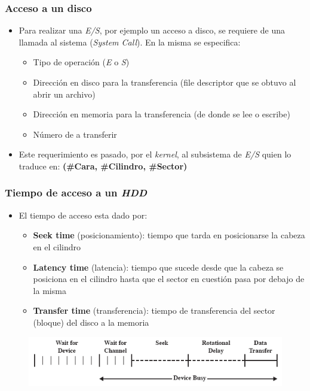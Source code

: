 \begin{frame}
  \frametitle{Acceso a un disco}
  \begin{itemize}
  	\item Para realizar una \emph{E/S}, por ejemplo un acceso a disco, se requiere de una llamada al sistema (\textit{System Call}). En la misma se especifica:
  	\begin{itemize}
  		\item Tipo de operación (\emph{E} o \emph{S})
  		\item Dirección en disco para la transferencia (file descriptor que se obtuvo al abrir un archivo)
  		\item Dirección en memoria para la transferencia (de donde se lee o escribe)
  		\item Número de \bytes a transferir
  	\end{itemize}
  	\item Este requerimiento es pasado, por el \textit{kernel}, al subsistema de \emph{E/S} quien lo traduce en: \textbf{(\#Cara, \#Cilindro, \#Sector)}
  \end{itemize}
\end{frame}

\begin{frame}
  \frametitle{Tiempo de acceso a un \textit{HDD}}
  \begin{itemize}
    \item El tiempo de acceso esta dado por:
    \begin{itemize}
      \item \textbf{Seek time} (posicionamiento): tiempo que tarda en posicionarse la cabeza en el cilindro 
      \item \textbf{Latency time} (latencia): tiempo que sucede desde que la cabeza se posiciona en el cilindro hasta que el sector en cuestión pasa por debajo de la misma
      \item \textbf{Transfer time} (transferencia): tiempo de transferencia del sector (bloque) del disco a la memoria
    \end{itemize}    
  \end{itemize}
  \begin{figure}
      \includegraphics[scale=0.4]{images/dat.png}
  \end{figure}
\end{frame}

